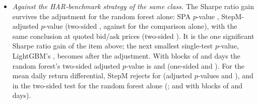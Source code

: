 \begin{itemize}
    of \rheHACCV. The bootstrap estimates the variance of the mean from blocks of \rhmcsBlock{} days and treats it as
    known, while the fixed-$b$ test uses a bandwidth of \rheHACS{} days and critical values that allow for the error
    of the variance estimate.
  \item \emph{Against the HAR-benchmark strategy of the same class.} The Sharpe ratio gain survives the adjustment
    for the random forest alone: SPA $p$-value \rhmcsMidTwinSrSpaC, StepM-adjusted $p$-value \rhmcsMidTwinSrPRf{}
    (two-sided \rhmcsMidTwinSrPTwoRf, against \rhmcsTwinTwoSidedPRf{} for the comparison alone), with the same
    conclusion at quoted bid/ask prices (two-sided \rhmcsBaTwinSrPTwoRf). It is the one significant Sharpe ratio gain
    of the item above; the next smallest single-test $p$-value, LightGBM's \rhmcsTwinTwoSidedPLgbm, becomes
    \rhmcsMidTwinSrPTwoLgbm{} after the adjustment. With blocks of \rhmcsBlockLo{} and \rhmcsBlockHi{} days the
    random forest's two-sided adjusted $p$-value is \rhmcsMidTwinSrPTwoMinLo{} and \rhmcsMidTwinSrPTwoMinHi{}
    (one-sided \rhmcsMidTwinSrPMinLo{} and \rhmcsMidTwinSrPMinHi). For the mean daily return differential, StepM
    rejects for \rhmcsMidTwinMeanRej{} (adjusted $p$-values \rhmcsMidTwinMeanPLgbm{} and \rhmcsMidTwinMeanPRf), and in
    the two-sided test for the random forest alone (\rhmcsMidTwinMeanPTwoRf; \rhmcsMidTwinMeanPTwoMinLo{} and
    \rhmcsMidTwinMeanPTwoMinHi{} with blocks of \rhmcsBlockLo{} and \rhmcsBlockHi{} days).
  \end{itemize}

